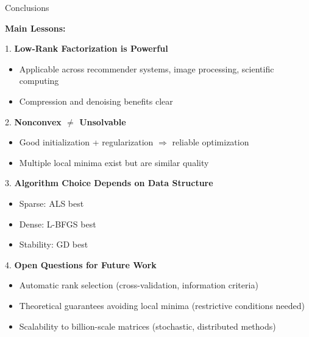 \documentclass[aspectratio=169,usenames,dvipsnames]{beamer}
\begin{document}
\begin{frame}{Conclusions}

\textbf{Main Lessons:}

\vspace{0.3cm}

1. \textbf{Low-Rank Factorization is Powerful}
   \begin{itemize}
     \item Applicable across recommender systems, image processing, scientific computing
     \item Compression and denoising benefits clear
   \end{itemize}

\vspace{0.2cm}

2. \textbf{Nonconvex $\neq$ Unsolvable}
   \begin{itemize}
     \item Good initialization + regularization $\Rightarrow$ reliable optimization
     \item Multiple local minima exist but are similar quality
   \end{itemize}

\vspace{0.2cm}

3. \textbf{Algorithm Choice Depends on Data Structure}
   \begin{itemize}
     \item Sparse: ALS best
     \item Dense: L-BFGS best
     \item Stability: GD best
   \end{itemize}

\vspace{0.2cm}

4. \textbf{Open Questions for Future Work}
   \begin{itemize}
     \item Automatic rank selection (cross-validation, information criteria)
     \item Theoretical guarantees avoiding local minima (restrictive conditions needed)
     \item Scalability to billion-scale matrices (stochastic, distributed methods)
   \end{itemize}

\end{frame}
\end{document}
